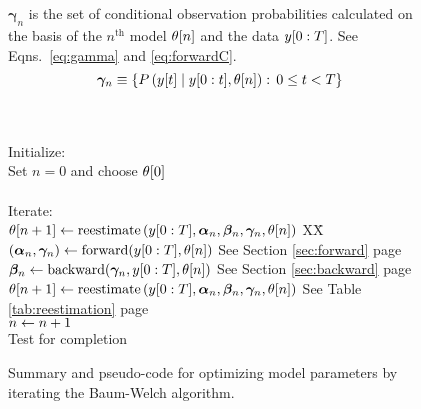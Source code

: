 \begin{figure}[htbp]
\begin{center}
{\begin{minipage}{0.90\textwidth}
\begin{tabbing}
\begin{minipage}[b]{1.0\textwidth}
\begin{equation*}
         \end{equation*}
      \end{minipage}\\ \\%
      \begin{minipage}[b]{1.0\textwidth}
         $\bm{\gamma}_n$ is the set of conditional observation probabilities
         calculated on the basis of the $n^{\text{th}}$ model ${\theta}{[n]}$ and
         the data $y[0:T]$.  See Eqns.~\eqref{eq:gamma} and
         \eqref{eq:forwardC}.
         \begin{equation*}
         \bm{\gamma}_n \equiv \left\{P \left({y}{[t]} \mid  y[0:t],
         {\theta}{[n]}\right) : \, 0 \leq t < T \right\}
         \end{equation*}
      \end{minipage}\\ \\%
      \<\-
      Initialize: \> \+ \\
      Set $n=0$ and choose ${\theta}{[0]}$\\ \\ \< \-
      Iterate: \> \+ \\
      ${\theta}{[n+1]} \leftarrow \text{reestimate} \left( y[0:T],
      \bm{\alpha}_n, \bm{\beta}_n, \bm{\gamma}_n, {\theta}{[n]}\right)$ XX\= \kill
      $\left(\bm{\alpha}_n,\bm{\gamma}_n\right) \leftarrow
      \text{forward}(y[0:T],{\theta}{[n]})$ \> See Section
      \ref{sec:forward} page \pageref{sec:forward}\\
      $\bm{\beta}_n \leftarrow \text{backward}(\bm{\gamma}_n, y[0:T],
      {\theta}{[n]})$ \> See Section \ref{sec:backward}  page \pageref{sec:backward}\\
      ${\theta}{[n+1]} \leftarrow \text{reestimate} \left( y[0:T],
      \bm{\alpha}_n, \bm{\beta}_n, \bm{\gamma}_n, {\theta}{[n]}\right)$ \> See Table
      \ref{tab:reestimation} page \pageref{tab:reestimation} \\
      $n \leftarrow n+1$ \\
      Test for completion
    \end{tabbing}
  \end{minipage}
}
\caption[Baum-Welch model parameter optimization.]%
{Summary and pseudo-code for optimizing model parameters by iterating
  the Baum-Welch algorithm. }
    \label{fig:train}
  \end{center}
\end{figure}

